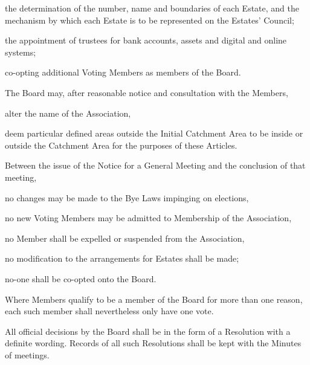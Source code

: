 \documentclass[10pt]{mk-articles-of-association}
\newcommand{\EC}[0]{Board}
\newcommand{\Exec}[0]{\EC{} }
\begin{document}
\begin{constenum}
\begin{constenum}
      \item the determination of the number, name
        and boundaries of each Estate, and the mechanism by which each Estate
        is to be represented on the Estates' Council;

      \item the appointment of trustees for bank accounts, assets and
        digital and online systems; \ITand

      \item co-opting additional Voting Members as members of the \EC{}.

    \end{constenum}

  \item The \Exec may, after reasonable notice and consultation with the
    Members,
    \begin{constenum}
    \item alter the name of the Association, \ITor
    \item deem particular defined areas outside the Initial Catchment Area
      to be inside or outside the Catchment Area
      for the purposes of these Articles.
    \end{constenum}

  \item Between the issue of the Notice for a General Meeting and
    the conclusion of that meeting,
    \begin{constenum}
      \item no changes may be made to the Bye Laws impinging on elections,
      \item no new Voting Members may be admitted to Membership of
        the Association,
      \item no Member shall be expelled or suspended from the Association,
      \item no modification to the arrangements for Estates shall be
        made; \ITand
      \item no-one shall be co-opted onto the \EC{}.
    \end{constenum}

  \item Where Members qualify to be a member of the \Exec for more
    than one reason, each such member shall nevertheless only have
    one vote.

  \item All official decisions by the \Exec shall be in the form of a
    Resolution with a definite wording. Records of
    all such Resolutions shall be kept with the
    Minutes of meetings.


\end{constenum}
\end{document}
